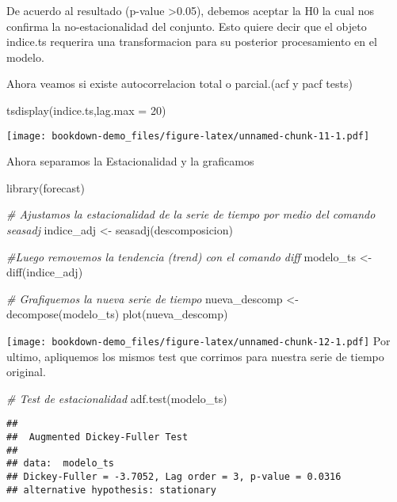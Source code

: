 \documentclass[
]{book}
\newenvironment{Shaded}{\begin{snugshade}}{\end{snugshade}}
\newcommand{\AttributeTok}[1]{\textcolor[rgb]{0.77,0.63,0.00}{#1}}
\newcommand{\CommentTok}[1]{\textcolor[rgb]{0.56,0.35,0.01}{\textit{#1}}}
\newcommand{\DecValTok}[1]{\textcolor[rgb]{0.00,0.00,0.81}{#1}}
\newcommand{\FunctionTok}[1]{\textcolor[rgb]{0.00,0.00,0.00}{#1}}
\newcommand{\NormalTok}[1]{#1}
\newcommand{\OtherTok}[1]{\textcolor[rgb]{0.56,0.35,0.01}{#1}}
\begin{document}
De acuerdo al resultado (p-value \textgreater0.05), debemos aceptar la H0 la cual nos confirma la no-estacionalidad del conjunto. Esto quiere decir que el objeto indice.ts requerira una transformacion para su posterior procesamiento en el modelo.

Ahora veamos si existe autocorrelacion total o parcial.(acf y pacf tests)

\begin{Shaded}
\begin{Highlighting}[]
\FunctionTok{tsdisplay}\NormalTok{(indice.ts,}\AttributeTok{lag.max =} \DecValTok{20}\NormalTok{)}
\end{Highlighting}
\end{Shaded}

\texttt{[image: bookdown-demo\_files/figure-latex/unnamed-chunk-11-1.pdf]}

Ahora separamos la Estacionalidad y la graficamos

\begin{Shaded}
\begin{Highlighting}[]
\FunctionTok{library}\NormalTok{(forecast)}

\CommentTok{\# Ajustamos la estacionalidad de la serie de tiempo por medio del comando seasadj}
\NormalTok{indice\_adj }\OtherTok{\textless{}{-}} \FunctionTok{seasadj}\NormalTok{(descomposicion)}

\CommentTok{\#Luego removemos la tendencia (trend) con el comando diff}
\NormalTok{modelo\_ts }\OtherTok{\textless{}{-}} \FunctionTok{diff}\NormalTok{(indice\_adj)}

\CommentTok{\# Grafiquemos la nueva serie de tiempo}
\NormalTok{nueva\_descomp }\OtherTok{\textless{}{-}}\FunctionTok{decompose}\NormalTok{(modelo\_ts)}
\FunctionTok{plot}\NormalTok{(nueva\_descomp)}
\end{Highlighting}
\end{Shaded}

\texttt{[image: bookdown-demo\_files/figure-latex/unnamed-chunk-12-1.pdf]}
Por ultimo, apliquemos los mismos test que corrimos para nuestra serie de tiempo original.

\begin{Shaded}
\begin{Highlighting}[]
\CommentTok{\# Test de estacionalidad}
\FunctionTok{adf.test}\NormalTok{(modelo\_ts)}
\end{Highlighting}
\end{Shaded}

\begin{verbatim}
## 
##  Augmented Dickey-Fuller Test
## 
## data:  modelo_ts
## Dickey-Fuller = -3.7052, Lag order = 3, p-value = 0.0316
## alternative hypothesis: stationary
\end{verbatim}
\end{document}
